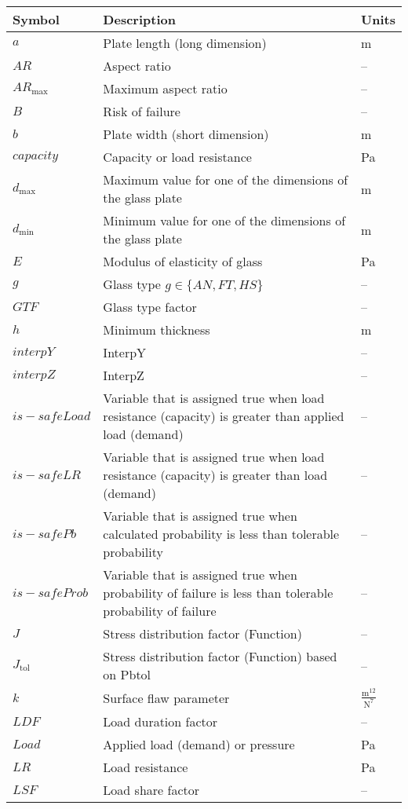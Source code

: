 \documentclass[12pt]{article}
\begin{document}
\begin{longtabu}{l X[l] l}
\toprule
\textbf{Symbol} & \textbf{Description} & \textbf{Units}
\\
\midrule
\endhead
$a$ & Plate length (long dimension) & m
\\
$AR$ & Aspect ratio & --
\\
${AR_{\text{max}}}$ & Maximum aspect ratio & --
\\
$B$ & Risk of failure & --
\\
$b$ & Plate width (short dimension) & m
\\
$capacity$ & Capacity or load resistance & Pa
\\
${d_{\text{max}}}$ & Maximum value for one of the dimensions of the glass plate & m
\\
${d_{\text{min}}}$ & Minimum value for one of the dimensions of the glass plate & m
\\
$E$ & Modulus of elasticity of glass & Pa
\\
$g$ & Glass type $g\in{}\{AN,FT,HS\}$ & --
\\
$GTF$ & Glass type factor & --
\\
$h$ & Minimum thickness & m
\\
$interpY$ & InterpY & --
\\
$interpZ$ & InterpZ & --
\\
$is-safeLoad$ & Variable that is assigned true when load resistance (capacity) is greater than applied load (demand) & --
\\
$is-safeLR$ & Variable that is assigned true when load resistance (capacity) is greater than load (demand) & --
\\
$is-safePb$ & Variable that is assigned true when calculated probability is less than tolerable probability & --
\\
$is-safeProb$ & Variable that is assigned true when probability of failure is less than tolerable probability of failure & --
\\
$J$ & Stress distribution factor (Function) & --
\\
${J_{\text{tol}}}$ & Stress distribution factor (Function) based on Pbtol & --
\\
$k$ & Surface flaw parameter & $\frac{\text{m}^{12}}{\text{N}^{7}}$
\\
$LDF$ & Load duration factor & --
\\
$Load$ & Applied load (demand) or pressure & Pa
\\
$LR$ & Load resistance & Pa
\\
$LSF$ & Load share factor & --

\end{longtabu}
\end{document}
